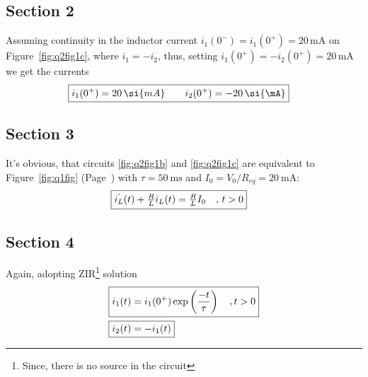 \documentclass[11pt,a4paper,titlepage]{article}
\makeatletter
\let\reftagform@=\tagform@
\def\tagform@#1{\maketag@@@{(\ignorespaces\textcolor{red}{#1}\unskip\@@italiccorr)}}
\renewcommand{\eqref}[1]{\textup{\reftagform@{\ref{#1}}}}
\makeatother
\begin{document}
{\subsection{Section 2}{
Assuming continuity in the inductor current $i_1(0^-)=i_1(0^+)=20\,\si{\mA}$ on Figure~\ref{fig:q2fig1c}, where $i_1=-i_2$, thus, setting $i_1(0^+)=-i_2(0^+)=20\,\si{\mA}$ we get the currents
\begin{align*}
\Aboxed{i_1(0^+)=20\,\si{mA} \qquad i_2(0^+)=-20\,\si{\mA}}
\end{align*}
}
\subsection{Section 3}{It's obvious, that circuits \ref{fig:q2fig1b} and \ref{fig:q2fig1c} are equivalent to Figure~\ref{fig:q1fig} (Page~\pageref{fig:q1fig}) with $\tau=50~\si{\ms}$ and $I_0=V_0/R_{eq}=20~\si{\mA}$:
\begin{align}
\Aboxed{\dot{i_L}(t)+\tfrac{R}{L}i_L(t)&=\tfrac{R}{L}I_0 \quad,\, t>0}
\end{align}
}
\subsection{Section 4}{Again, adopting ZIR\footnote{Since, there is no source in the circuit} solution~\eqref{eq:7} 
\begin{align*}
\Aboxed{i_1(t)&=i_1(0^+)\exp\left({\dfrac{-t}{\tau}}\right) \quad, t>0} \\ \label{eq:8}
\Aboxed{i_2(t)&=-i_1(t)}
\end{align*}
}
}\label{sec:q2sec}
\end{document}
